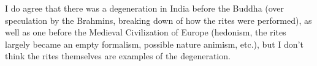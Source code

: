 \begin{footnotesize}
\begin{sffamily}
I do agree that there was a degeneration in India before the Buddha (over speculation by the Brahmins, breaking down of how the rites were performed), as well as one before the Medieval Civilization of Europe (hedonism, the rites largely became an empty formalism, possible nature animism, etc.), but I don't think the rites themselves are examples of the degeneration.


\end{sffamily}\end{footnotesize}
